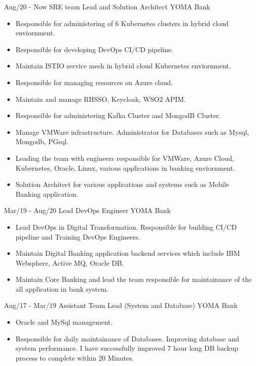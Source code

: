 \documentclass[]{friggeri-cv}
\begin{document}
\begin{entrylist}
  \entry
    {Aug/20 - Now}
    {SRE team Lead and Solution Architect}
    {YOMA Bank}
    { \begin{itemize}
      \item Responsible for administering of 6 Kubernetes clusters in hybrid cloud enviornment.
      \item Responsible for developing DevOps CI/CD pipeline.
      \item Maintain ISTIO service mesh in hybrid cloud Kubernetes enviornment.
      \item Responsible for managing resources on Azure cloud.
      \item Maintain and manage RHSSO, Keycloak, WSO2 APIM.
      \item Responsible for administering Kafka Cluster and MongodB Cluster.
      \item Manage VMWare infrastructure. Administrator for Databases such as Mysql, Mongodb, PGsql.
      \item Leading the team with engineers responsible for VMWare, Azure Cloud, Kubernetes, Oracle, Linux, various applications in banking enviornment.
      \item Solution Architect for various applications and systems such as Mobile Banking application.
      \end{itemize}
    }
  \entry
    {Mar/19 - Aug/20}
    {Lead DevOps Engineer}
    {YOMA Bank}
    { \begin{itemize}
        \item Lead DevOps in Digital Transformation. Responsible for building CI/CD pipeline and Training DevOps Engineers.
        \item Maintain Digital Banking application backend services which include IBM Websphere, Active MQ, Oracle DB.
        \item Maintain Core Banking and lead the team responsible for maintainance of the all application in bank system.
      \end{itemize}
    }
  \entry
    {Aug/17 - Mar/19}
    {Assistant Team Lead (System and Database)}
    {YOMA Bank}
    {
      \begin{itemize}
        \item Oracle and MySql management.
        \item Responsible for daily maintainance of Databases. Improving database and system performance. I have successfully improved 7 hour long DB backup process to complete within 20 Minutes.
      \end{itemize}
}
\end{entrylist}
\end{document}
